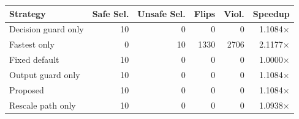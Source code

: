 \begin{tabular}{lrrrrr}
\toprule
Strategy & Safe Sel. & Unsafe Sel. & Flips & Viol. & Speedup \\
\midrule
Decision guard only & 10 & 0 & 0 & 0 & 1.1084$\times$ \\
Fastest only & 0 & 10 & 1330 & 2706 & 2.1177$\times$ \\
Fixed default & 10 & 0 & 0 & 0 & 1.0000$\times$ \\
Output guard only & 10 & 0 & 0 & 0 & 1.1084$\times$ \\
Proposed & 10 & 0 & 0 & 0 & 1.1084$\times$ \\
Rescale path only & 10 & 0 & 0 & 0 & 1.0938$\times$ \\
\bottomrule
\end{tabular}
